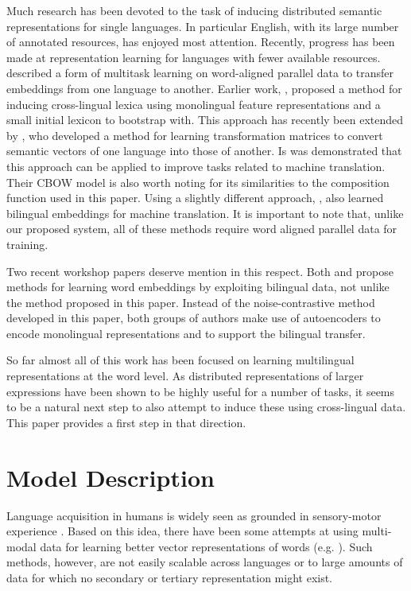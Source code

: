 \documentclass{article} \pdfoutput=1
\begin{document}
Much research has been devoted to the task of inducing distributed semantic
representations for single languages.  In particular English, with its large
number of annotated resources, has enjoyed most attention.  Recently, progress
has been made at representation learning for languages with fewer available
resources.  \citet{Klementiev:2012} described a form of multitask learning on
word-aligned parallel data to transfer embeddings from one language to another.
Earlier work, \citet{Haghighi:2008}, proposed a method for inducing
cross-lingual lexica using monolingual feature representations and a small
initial lexicon to bootstrap with.  This approach has recently been extended by
\cite{Mikolov:2013,Mikolov:2013a}, who developed a method for learning
transformation matrices to convert semantic vectors of one language into those
of another.  Is was demonstrated that this approach can be applied to improve
tasks related to machine translation.  Their CBOW model is also worth noting for
its similarities to the composition function used in this paper.  Using a
slightly different approach, \cite{Zou:2013}, also learned bilingual embeddings
for machine translation.  It is important to note that, unlike our proposed
system, all of these methods require word aligned parallel data for training.

Two recent workshop papers deserve mention in this respect. Both
\citet{Lauly:2013} and \citet{Chandar:2013} propose methods for learning
word embeddings by exploiting bilingual data, not unlike the method proposed in
this paper. Instead of the noise-contrastive method developed in this paper,
both groups of authors make use of autoencoders to encode monolingual
representations and to support the bilingual transfer.

So far almost all of this work has been focused on learning multilingual
representations at the word level. As distributed representations of larger
expressions have been shown to be highly useful for a number of tasks, it seems
to be a natural next step to also attempt to induce these using cross-lingual
data. This paper provides a first step in that direction.
 \section{Model Description}

Language acquisition in humans is widely seen as grounded in sensory-motor experience \cite{Roy:2003,Bloom:2001}.
Based on this idea, there have been some attempts at using multi-modal data for learning better vector representations of words (e.g. \cite{Srivastava:2012}).
Such methods, however, are not easily scalable across languages or to large amounts of data for which no secondary or tertiary representation might exist.
\end{document}
